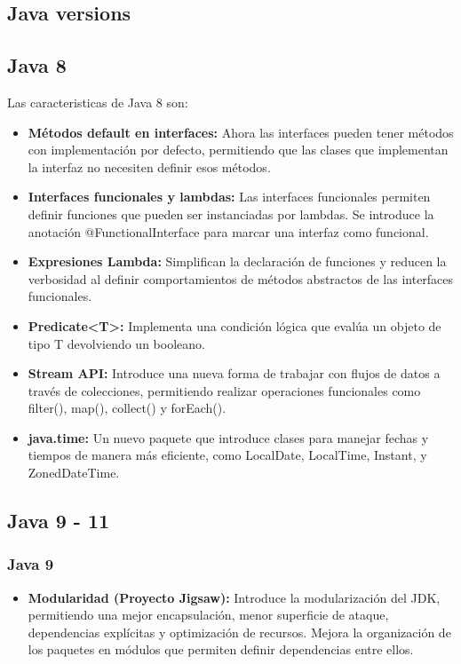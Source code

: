 \begin{center}
	\section{Java versions}
	\subsection{Java 8}
	Las caracteristicas de Java 8 son:
	\begin{itemize}
		\item \textbf{Métodos default en interfaces: }Ahora las interfaces pueden tener métodos con implementación por defecto,
		      permitiendo que las clases que implementan la interfaz no necesiten definir esos métodos.

		\item \textbf{Interfaces funcionales y lambdas: }Las interfaces funcionales permiten definir funciones
		      que pueden ser instanciadas por lambdas. Se introduce la anotación @FunctionalInterface
		      para marcar una interfaz como funcional.

		\item \textbf{Expresiones Lambda: }Simplifican la declaración de funciones y reducen la verbosidad al
		      definir comportamientos de métodos abstractos de las interfaces funcionales.

		\item  \textbf{Predicate<T>:} Implementa una condición lógica que evalúa un objeto de tipo T
		      devolviendo un booleano.

		\item \textbf{Stream API:} Introduce una nueva forma de trabajar con flujos de datos a través
		      de colecciones, permitiendo realizar operaciones funcionales como filter(), map(), collect() y forEach().

		\item \textbf{java.time:} Un nuevo paquete que introduce clases para manejar fechas
		      y tiempos de manera más eficiente, como LocalDate, LocalTime, Instant, y ZonedDateTime.

	\end{itemize}

	\subsection{Java 9 - 11}
	\subsubsection{Java 9}
	\begin{itemize}
		\item  \textbf{Modularidad (Proyecto Jigsaw): }Introduce la modularización del JDK,
		      permitiendo una mejor encapsulación, menor superficie de ataque, dependencias explícitas
		      y optimización de recursos. Mejora la organización de los paquetes en módulos que permiten
		      definir dependencias entre ellos.


\end{itemize}
\end{center}
